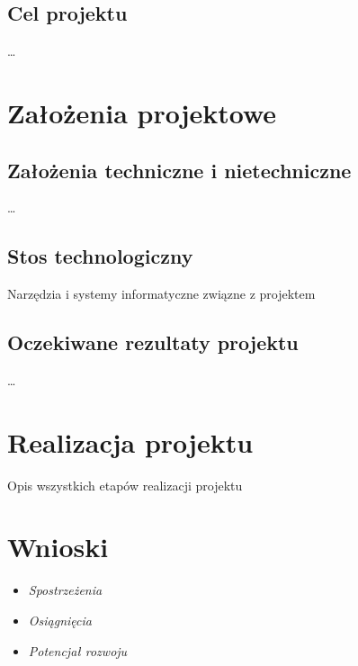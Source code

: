 \documentclass[12pt,a4paper]{article}
\begin{document}
\subsection{Cel projektu}
\ldots 

\newpage

\section{Założenia projektowe}

\subsection{Założenia techniczne i nietechniczne}
\ldots 

\subsection{Stos technologiczny}
Narzędzia i systemy informatyczne związne z projektem

\subsection{Oczekiwane rezultaty projektu}
\ldots 

\newpage
\section{Realizacja projektu}
Opis wszystkich etapów realizacji projektu

\newpage
\section{Wnioski}

\begin{itemize}
\item \textit{Spostrzeżenia}
\item \textit{Osiągnięcia}
\item \textit{Potencjał rozwoju}
\end{itemize}
\end{document}
